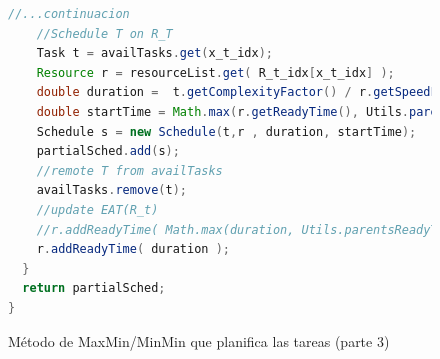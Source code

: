 \begin{figure}
\label{code:xmin_detail_3}
\begin{lstlisting}[language=java]
    //...continuacion
    //Schedule T on R_T
    Task t = availTasks.get(x_t_idx);
    Resource r = resourceList.get( R_t_idx[x_t_idx] );
    double duration =  t.getComplexityFactor() / r.getSpeedFactor();
    double startTime = Math.max(r.getReadyTime(), Utils.parentsReadyTime(t, partialSched, w));
    Schedule s = new Schedule(t,r , duration, startTime);
    partialSched.add(s);
    //remote T from availTasks
    availTasks.remove(t);
    //update EAT(R_t)
    //r.addReadyTime( Math.max(duration, Utils.parentsReadyTime(t, partialSched, w)) );
    r.addReadyTime( duration );
  }
  return partialSched;
}
\end{lstlisting}
\caption{Método de MaxMin/MinMin que planifica las tareas (parte 3)}
\end{figure}